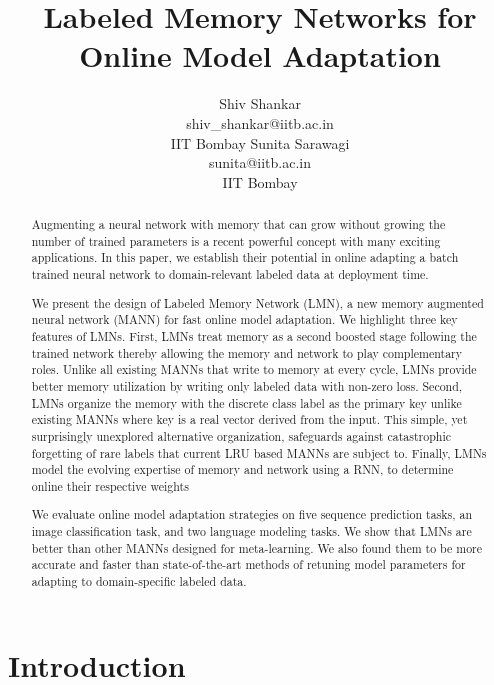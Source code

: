 \documentclass[letterpaper]{article} %
\begin{document}
\title{Labeled Memory Networks for Online Model Adaptation}
\author{Shiv Shankar\\
shiv\_shankar@iitb.ac.in\\
IIT Bombay
\And
Sunita Sarawagi\\
sunita@iitb.ac.in\\
IIT Bombay
}

\maketitle
\begin{abstract}
Augmenting a neural network with memory that can grow without growing the number of trained parameters is a recent powerful concept with many exciting applications.  In this paper, we establish their potential in online adapting a batch trained neural network to  domain-relevant labeled data at deployment time.


We present the design of Labeled Memory Network (LMN), a new  memory augmented neural network (MANN) for fast online model adaptation.  We highlight three key features of LMNs.
First, LMNs treat memory as a second boosted stage following the trained network thereby allowing the memory and network to play complementary roles.  Unlike all existing MANNs that write to memory at every cycle, LMNs provide better memory utilization by writing only labeled data with non-zero loss.
Second, LMNs organize the memory with the discrete class label as the primary key unlike existing MANNs where key is a real vector derived from the input. This simple, yet surprisingly unexplored alternative organization, safeguards against catastrophic forgetting of rare labels that current LRU based MANNs are subject to. Finally, LMNs  model the evolving expertise of memory and network using a RNN, to determine online their respective weights

We evaluate online model adaptation strategies on five sequence prediction tasks, an image classification task, and two language modeling tasks. We show that LMNs are better than other MANNs designed for meta-learning. We also found them to be more accurate and faster than state-of-the-art methods of retuning model parameters for adapting to domain-specific labeled data.
\end{abstract}



\section{Introduction}
\end{document}
